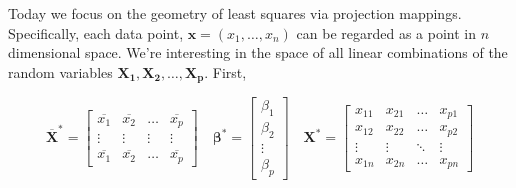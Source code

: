 \documentclass[12pt]{article}  %
\newcommand{\bb}{{\boldsymbol{\beta}}}
\begin{document}
Today we focus on the geometry of least squares via projection mappings. Specifically, each data point, $\mathbf{x} = (x_1, \ldots, x_n)$ can be regarded as a point in $n$ dimensional space. We're interesting in the space of all linear combinations of the random variables $\mathbf{X_1, X_2, \ldots, X_p}$. First, 

\[
\overline{\mathbf{X}}^{*} = \begin{bmatrix}
    \overline{x_{1}} & \overline{x_{2}}  & \dots  & \overline{x_{p}}\\
    \vdots & \vdots & \vdots &  \vdots \\
    \overline{x_{1}} & \overline{x_{2}} & \dots  & \overline{x_{p}}
\end{bmatrix}\hspace{1em} \bb^{*} = \begin{bmatrix}\beta_1\\ \beta_2\\ \vdots \\ \beta_p\end{bmatrix} \hspace{1em} \mathbf{X}^{*} = \begin{bmatrix}
    x_{11} & x_{21} &  \dots  & x_{p1} \\
    x_{12} & x_{22} & \dots  & x_{p2} \\
    \vdots & \vdots & \ddots & \vdots \\
    x_{1n} & x_{2n} & \dots  & x_{pn}
\end{bmatrix}
\]
\end{document}
